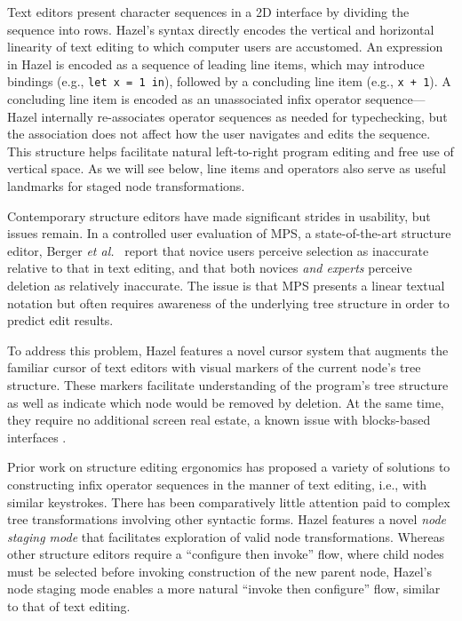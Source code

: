\documentclass[format=sigplan,dvipsnames,backend=bibtex]{acmart}
\newcommand{\Hazel}{\textsf{Hazel}\xspace}
\begin{document}
Text editors present character sequences in a 2D interface by dividing the
	sequence into rows.
\Hazel's syntax directly encodes the vertical and horizontal linearity of text
	editing to which computer users are accustomed.
An expression in \Hazel is encoded as a sequence of leading line items, which may
	introduce bindings (e.g., \texttt{let x = 1 in}), followed by a concluding line
	item (e.g., \texttt{x + 1}).
A concluding line item is encoded as an unassociated infix operator sequence---\Hazel 
	internally re-associates operator sequences as needed for typechecking, but the
	association does not affect how the user navigates and edits the sequence.
This structure helps facilitate natural left-to-right program editing and free use of
	vertical space.
As we will see below, line items and operators also serve as useful landmarks for staged
	node transformations.

Contemporary structure editors have made significant strides in usability, but
	issues remain.
In a controlled user evaluation of MPS, a state-of-the-art structure editor,
	Berger \emph{et al.}~ \cite{ProjEfficiency}
	report that novice users perceive selection as inaccurate relative to that in text
	editing, and that both novices \emph{and experts} perceive deletion as relatively inaccurate.
The issue is that MPS presents a linear textual notation but often requires awareness of the 
	underlying tree structure in order to predict edit results.

To address this problem, \Hazel features a novel cursor system that augments the familiar
	cursor of text editors with visual markers of the current node's tree structure.
These markers facilitate understanding of the program's tree structure as well as indicate
	which node would be removed by deletion.
At the same time, they require no additional screen real estate, a known issue with
	blocks-based interfaces \cite{BlocksFingertips}.

Prior work on structure editing ergonomics has proposed a variety of solutions to 
	constructing infix operator sequences in the manner of text editing, i.e., with similar 
	keystrokes.
There has been comparatively little attention paid to complex tree transformations involving other 
	syntactic forms.
\Hazel features a novel \emph{node staging mode} that facilitates exploration of valid
	node transformations.
Whereas other structure editors require a ``configure then invoke'' flow, where child
	nodes must be selected before invoking construction of the new parent node, \Hazel's
	node staging mode enables a more natural ``invoke then configure'' flow, similar to
	that of text editing.
\end{document}

